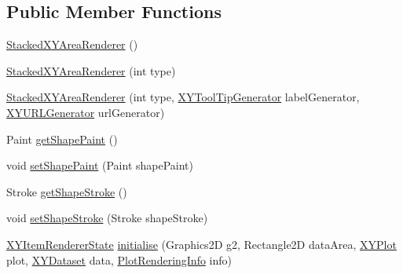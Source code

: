 \subsection*{Public Member Functions}
\begin{DoxyCompactItemize}
\item 
\mbox{\hyperlink{classorg_1_1jfree_1_1chart_1_1renderer_1_1xy_1_1_stacked_x_y_area_renderer_aba9877e3515436e93e892451a011bfdf}{Stacked\+X\+Y\+Area\+Renderer}} ()
\item 
\mbox{\hyperlink{classorg_1_1jfree_1_1chart_1_1renderer_1_1xy_1_1_stacked_x_y_area_renderer_a7d0d74daafc67fdad220220c5628d6d0}{Stacked\+X\+Y\+Area\+Renderer}} (int type)
\item 
\mbox{\hyperlink{classorg_1_1jfree_1_1chart_1_1renderer_1_1xy_1_1_stacked_x_y_area_renderer_a7e08fe85e9ac906fbe70cbd3114e6971}{Stacked\+X\+Y\+Area\+Renderer}} (int type, \mbox{\hyperlink{interfaceorg_1_1jfree_1_1chart_1_1labels_1_1_x_y_tool_tip_generator}{X\+Y\+Tool\+Tip\+Generator}} label\+Generator, \mbox{\hyperlink{interfaceorg_1_1jfree_1_1chart_1_1urls_1_1_x_y_u_r_l_generator}{X\+Y\+U\+R\+L\+Generator}} url\+Generator)
\item 
Paint \mbox{\hyperlink{classorg_1_1jfree_1_1chart_1_1renderer_1_1xy_1_1_stacked_x_y_area_renderer_a9c7a8202060efd770f918de1b08b1c99}{get\+Shape\+Paint}} ()
\item 
void \mbox{\hyperlink{classorg_1_1jfree_1_1chart_1_1renderer_1_1xy_1_1_stacked_x_y_area_renderer_a5fe211010f288c2e06cd2008c2ddb27d}{set\+Shape\+Paint}} (Paint shape\+Paint)
\item 
Stroke \mbox{\hyperlink{classorg_1_1jfree_1_1chart_1_1renderer_1_1xy_1_1_stacked_x_y_area_renderer_a7d343ec4504d7c82a0c08d37c0e96410}{get\+Shape\+Stroke}} ()
\item 
void \mbox{\hyperlink{classorg_1_1jfree_1_1chart_1_1renderer_1_1xy_1_1_stacked_x_y_area_renderer_a8124f9930c21557b4132fc07ed7366db}{set\+Shape\+Stroke}} (Stroke shape\+Stroke)
\item 
\mbox{\hyperlink{classorg_1_1jfree_1_1chart_1_1renderer_1_1xy_1_1_x_y_item_renderer_state}{X\+Y\+Item\+Renderer\+State}} \mbox{\hyperlink{classorg_1_1jfree_1_1chart_1_1renderer_1_1xy_1_1_stacked_x_y_area_renderer_acae9be78da1b7cc21ccb2e8ac91f2c06}{initialise}} (Graphics2D g2, Rectangle2D data\+Area, \mbox{\hyperlink{classorg_1_1jfree_1_1chart_1_1plot_1_1_x_y_plot}{X\+Y\+Plot}} plot, \mbox{\hyperlink{interfaceorg_1_1jfree_1_1data_1_1xy_1_1_x_y_dataset}{X\+Y\+Dataset}} data, \mbox{\hyperlink{classorg_1_1jfree_1_1chart_1_1plot_1_1_plot_rendering_info}{Plot\+Rendering\+Info}} info)

\end{DoxyCompactItemize}

